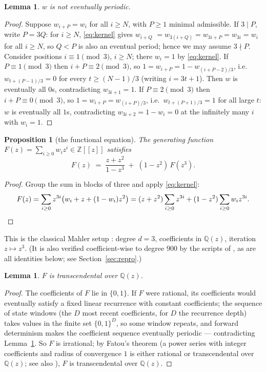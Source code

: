 \documentclass[11pt]{article}
\newtheorem{lemma}[theorem]{Lemma}
\newtheorem{proposition}[theorem]{Proposition}
\theoremstyle{definition}
\newcommand{\Z}{\mathbb{Z}}
\newcommand{\Q}{\mathbb{Q}}
\begin{document}
\begin{lemma}\label{lem:aperiodic}
$w$ is not eventually periodic.
\end{lemma}

\begin{proof}
Suppose $w_{i+P} = w_i$ for all $i \ge N$, with $P \ge 1$ minimal
admissible. If $3 \mid P$, write $P = 3Q$: for $i \ge N$,
\eqref{eq:kernel} gives $w_{i+Q}$ $= w_{3(i+Q)} = w_{3i + P} = w_{3i}
= w_i$ for all $i \ge N$, so $Q < P$ is also an eventual period;
hence we may assume $3 \nmid P$. Consider positions
$i \equiv 1 \pmod 3$, $i \ge N$; there $w_i = 1$ by
\eqref{eq:kernel}. If $P \equiv 1 \pmod 3$ then $i + P \equiv 2
\pmod 3$, so $1 = w_{i+P} = 1 - w_{(i+P-2)/3}$, i.e.\
$w_{t + (P-1)/3} = 0$ for every $t \ge (N-1)/3$ (writing $i = 3t+1$).
Then $w$ is eventually all $0$s, contradicting $w_{3i+1} = 1$. If
$P \equiv 2 \pmod 3$ then $i + P \equiv 0 \pmod 3$, so
$1 = w_{i+P} = w_{(i+P)/3}$, i.e.\ $w_{t + (P+1)/3} = 1$ for all large
$t$: $w$ is eventually all $1$s, contradicting
$w_{3i+2} = 1 - w_i = 0$ at the infinitely many $i$ with $w_i = 1$.
\end{proof}

\begin{proposition}[the functional equation]\label{prop:feq}
The generating function $F(z) = \sum_{i \ge 0} w_i z^i \in \Z[[z]]$
satisfies
\[
F(z) \;=\; \frac{z + z^2}{1 - z^3} \;+\; (1 - z^2)\, F(z^3).
\]
\end{proposition}

\begin{proof}
Group the sum in blocks of three and apply \eqref{eq:kernel}:
\[
F(z) = \sum_{i \ge 0} z^{3i}\bigl(w_i + z + (1 - w_i)z^2\bigr)
     = (z + z^2)\sum_{i\ge0} z^{3i} + (1 - z^2)\sum_{i\ge0} w_i z^{3i}.
\qedhere
\]
\end{proof}

This is the classical Mahler setup \cite{mahler, nishioka}: degree
$d = 3$, coefficients in $\Q(z)$, iteration $z \mapsto z^3$. (It is
also verified coefficient-wise to degree $900$ by the scripts of
\cite{companion}, as are all identities below; see
Section~\ref{sec:repro}.)

\begin{lemma}\label{lem:fatou}
$F$ is transcendental over $\Q(z)$.
\end{lemma}

\begin{proof}
The coefficients of $F$ lie in $\{0,1\}$. If $F$ were rational, its
coefficients would eventually satisfy a fixed linear recurrence with
constant coefficients; the sequence of state windows (the $D$ most
recent coefficients, for $D$ the recurrence depth) takes values in
the finite set $\{0,1\}^D$, so some window repeats, and forward
determinism makes the coefficient sequence eventually periodic ---
contradicting Lemma~\ref{lem:aperiodic}. So $F$ is irrational; by
Fatou's theorem \cite{fatou} (a power series with integer
coefficients and radius of convergence $1$ is either rational or
transcendental over $\Q(z)$; see also \cite[Ch.~6]{as}),
$F$ is transcendental over $\Q(z)$.
\end{proof}
\end{document}
